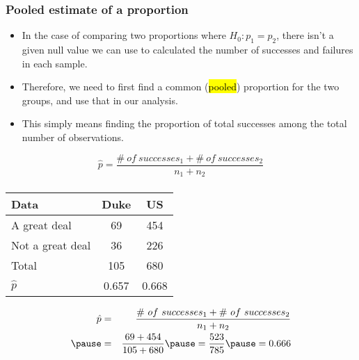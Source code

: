 \documentclass[slidestop,compress,mathserif]{beamer}
\newcommand{\soln}[1]{\textit{#1}}
\begin{document}
\begin{frame}
\frametitle{Pooled estimate of a proportion}

\begin{itemize}

\item In the case of comparing two proportions where $H_0: p_1 = p_2$, there isn't a given null value we can use to calculated the  number of successes and failures in each sample.

\pause

\item Therefore, we need to first find a common (\hl{pooled}) proportion for the two groups, and use that in our analysis.

\pause

\item This simply means finding the proportion of total successes among the total number of observations.

\end{itemize}

$\:$ \\

{ \[ \hat{p} = \frac{\#~of~successes_1 + \#~of~successes_2}{n_1 + n_2} \] }

\end{frame}


\begin{frame}
\frametitle{}


{\footnotesize
\begin{center}
\begin{tabular}{l | c c}
Data			& Duke		& US \\
\hline
A great deal	& 69			& 454 \\
Not a great deal& 36			& 226 \\
\hline
Total			& 105		& 680 \\
\hline
$\hat{p}$		& 0.657		& 0.668
\end{tabular}
\end{center}
}

\pause

\soln{
\begin{eqnarray*}
\hat{p} &=& \frac{\#~of~successes_1 + \#~of~successes_2}{n_1 + n_2} \\
\pause
&=& \frac{69+454}{105+680} \pause = \frac{523}{785} \pause = 0.666
\end{eqnarray*}
}

\end{frame}
\end{document}
